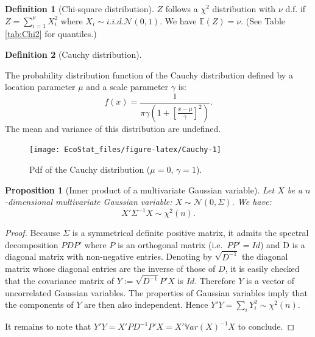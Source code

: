 \documentclass[
  12pt,
]{book}
\newtheorem{proposition}{Proposition}[chapter]
\theoremstyle{definition}
\newtheorem{definition}{Definition}[chapter]
\theoremstyle{definition}
\theoremstyle{definition}
\theoremstyle{definition}
\theoremstyle{remark}
\begin{document}
\begin{definition}[Chi-square distribution]
\protect\hypertarget{def:chi2}{}\label{def:chi2}\(Z\) follows a \(\chi^2\) distribution with \(\nu\) d.f. if \(Z = \sum_{i=1}^{\nu}X_i^2\) where \(X_i \sim i.i.d. \mathcal{N}(0,1)\).
We have \(\mathbb{E}(Z)=\nu\). (See Table \ref{tab:Chi2} for quantiles.)
\end{definition}

\begin{definition}[Cauchy distribution]
\protect\hypertarget{def:Cauchy}{}\label{def:Cauchy}

The probability distribution function of the Cauchy distribution defined by a location parameter \(\mu\) and a scale parameter \(\gamma\) is:
\[
f(x) = \frac{1}{\pi \gamma \left(1 + \left[\frac{x-\mu}{\gamma}\right]^2\right)}.
\]
The mean and variance of this distribution are undefined.

\begin{figure}
\texttt{[image: EcoStat\_files/figure-latex/Cauchy-1]} \caption{Pdf of the Cauchy distribution ($\mu=0$, $\gamma=1$).}\label{fig:Cauchy}
\end{figure}

\end{definition}

\begin{proposition}[Inner product of a multivariate Gaussian variable]
\protect\hypertarget{prp:waldtypeproduct}{}\label{prp:waldtypeproduct}Let \(X\) be a \(n\)-dimensional multivariate Gaussian variable: \(X \sim \mathcal{N}(0,\Sigma)\). We have:
\[
X' \Sigma^{-1}X \sim \chi^2(n).
\]
\end{proposition}

\begin{proof}
Because \(\Sigma\) is a symmetrical definite positive matrix, it admits the spectral decomposition \(PDP'\) where \(P\) is an orthogonal matrix (i.e.~\(PP'=Id\)) and D is a diagonal matrix with non-negative entries. Denoting by \(\sqrt{D^{-1}}\) the diagonal matrix whose diagonal entries are the inverse of those of \(D\), it is easily checked that the covariance matrix of \(Y:=\sqrt{D^{-1}}P'X\) is \(Id\). Therefore \(Y\) is a vector of uncorrelated Gaussian variables. The properties of Gaussian variables imply that the components of \(Y\) are then also independent. Hence \(Y'Y=\sum_i Y_i^2 \sim \chi^2(n)\).

It remains to note that \(Y'Y=X'PD^{-1}P'X=X'\mathbb{V}ar(X)^{-1}X\) to conclude.
\end{proof}
\end{document}
